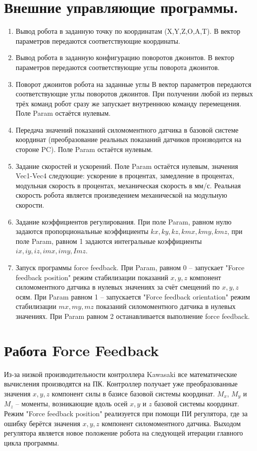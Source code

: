 \documentclass[a4paper,14pt,russian]{extreport} \usepackage{extsizes}
\begin{document}
		\section{Внешние управляющие программы.}
		\begin{enumerate}  
			\item{	Вывод робота в заданную точку по координатам (X,Y,Z,O,A,T). В вектор параметров передаются соответствующие координаты. }
			\item{	Вывод робота в заданную конфигурацию поворотов джоинтов. В вектор параметров передаются соответствующие углы поворота джоинтов.}
			\item{	Поворот джоинтов робота на заданные углы В вектор параметров передаются соответствующие углы поворотов джоинтов.
				При получении любой из первых трёх команд робот сразу же запускает внутреннюю команду перемещения. Поле Param остаётся нулевым.}
			\item{	Передача значений показаний силомоментного датчика в базовой системе координат (преобразование реальных показаний датчиков производится на стороне PC). Поле Param остаётся нулевым.}
			\item{	Задание скоростей и ускорений. Поле Param остаётся нулевым, значения Vec1-Vec4 следующие: ускорение в процентах, замедление в процентах, модульная скорость в процентах, механическая скорость в мм/с. Реальная скорость робота является произведением механической на модульную скорости.}
			\item{	Задание коэффициентов регулирования. При поле Param, равном нулю задаются пропорциональные коэффициенты $kx,ky,kz,kmx,kmy,kmz$, при поле Param, равном 1 задаются интегральные коэффициенты  $ix,iy,iz,imx,imy,Imz$.}
			\item{	Запуск программы force feedback. При Param, равном 0 – запускает "Force feedback position" режим стабилизации показаний $x,y,z$ компонент силомоментного датчика в нулевых значениях  за счёт смещений по $x,y,z$ осям. При Param равном 1 – запускается "Force feedback orientation" режим стабилизации $mx,my,mz$ показаний силомоментного датчика в нулевых значениях. При Param равном 2 останавливается выполнение force feedback.}
		\end{enumerate}   
		
		\section{Работа Force Feedback}
		
		Из-за низкой производительности контроллера Kawasaki все математические вычисления производятся на ПК. Контроллер получает уже преобразованные значения $x,y,z$ компонент силы в базисе базовой системы координат. $M_x$, $M_y$ и $M_z$ – моменты, возникающие вдоль осей $x,y$ и $z$ базовой системы координат. Режим "Force feedback position" реализуется при помощи ПИ регулятора, где за ошибку берётся значения $x,y,z$ компонент силомоментного датчика. Выходом регулятора  является  новое положение робота на следующей итерации главного цикла программы.  
		
\end{document}
